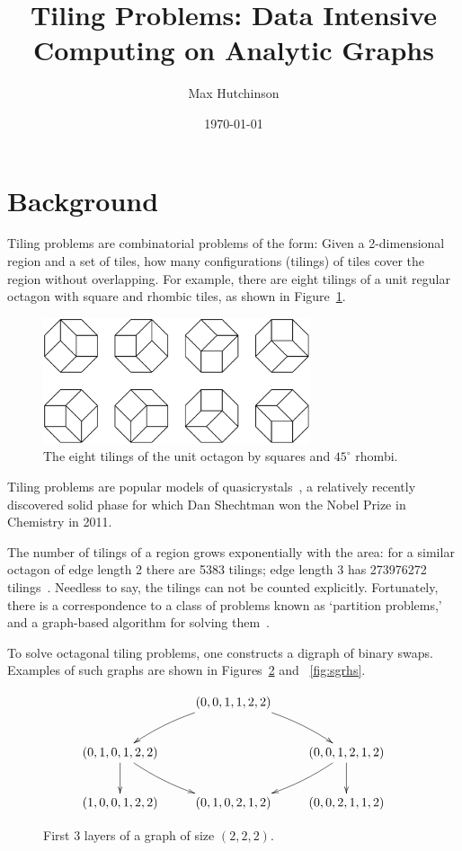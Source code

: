 \documentclass{article}
\begin{document}
\title{Tiling Problems: Data Intensive Computing on Analytic Graphs}
\author{Max Hutchinson}
\date{\today}
\maketitle

\section*{Background}

Tiling problems are combinatorial problems of the form: Given a 2-dimensional region and a set of tiles, how many configurations (tilings) of tiles cover the region without overlapping.  For example, there are eight tilings of a unit regular octagon with square and rhombic tiles, as shown in Figure~\ref{fig:examp}.
\begin{figure}[h!]
\begin{center}
\includegraphics[width=0.7\textwidth]{unit_tilings}
\end{center}
\caption{The eight tilings of the unit octagon by squares and $45^\circ$ rhombi.}
\label{fig:examp}
\end{figure} 
Tiling problems are popular models of quasicrystals~\cite{Shechtman1984,Levine1984}, a relatively recently discovered solid phase for which Dan Shechtman won the Nobel Prize in Chemistry in 2011.

The number of tilings of a region grows exponentially with the area: for a similar octagon of edge length 2 there are 5383 tilings; edge length 3 has 273976272 tilings~\cite{Dest04}.  Needless to say, the tilings can not be counted explicitly.  Fortunately, there is a correspondence to a class of problems known as `partition problems,' and a graph-based algorithm for solving them~\cite{Dest01}.

To solve octagonal tiling problems, one constructs a digraph of binary swaps.  Examples of such graphs are shown in Figures~\ref{fig:graph} and ~\ref{fig:sgrhs}.
\begin{figure}[h!]
\begin{center}
$$\xymatrix{
& \ar@/_/[dl] \left(0, 0, 1, 1, 2, 2\right) \ar@/^/[dr]& \\
\left(0, 1, 0, 1, 2, 2\right) \ar[d] \ar@/_/[dr] & &  \ar@/^/[dl] \ar[d] \left(0, 0, 1, 2, 1, 2\right) \\
\left(1, 0, 0, 1, 2, 2\right) & \left(0, 1, 0, 2, 1, 2\right) &  \left(0, 0, 2, 1, 1, 2\right)}$$ 
\end{center}
\caption{First 3 layers of a graph of size $(2,2,2)$.}
\label{fig:graph}
\end{figure}
\end{document}
